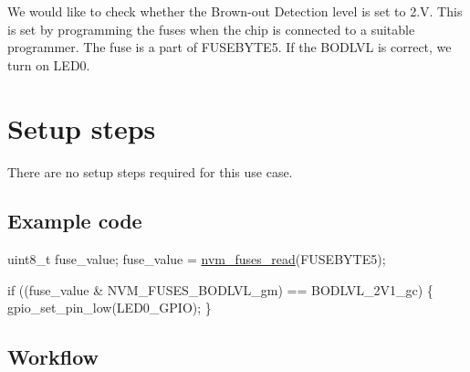We would like to check whether the Brown-\/out Detection level is set to 2.\-V. This is set by programming the fuses when the chip is connected to a suitable programmer. The fuse is a part of F\-U\-S\-E\-B\-Y\-T\-E5. If the B\-O\-D\-L\-V\-L is correct, we turn on L\-E\-D0.\hypertarget{xmega_nvm_quickstart_xmega_nvm_quickstart_fuse_case_setup_steps}{}\section{Setup steps}\label{xmega_nvm_quickstart_xmega_nvm_quickstart_fuse_case_setup_steps}
There are no setup steps required for this use case.\hypertarget{xmega_nvm_quickstart_nvm_quickstart_fuse_case_example_code}{}\subsection{Example code}\label{xmega_nvm_quickstart_nvm_quickstart_fuse_case_example_code}

\begin{DoxyCode}
         uint8\_t fuse\_value;
         fuse\_value = \hyperlink{group__nvm__fuse__lock__group_ga7f38ae8b811b4b6c7a209e37cfe1b03d}{nvm\_fuses\_read}(FUSEBYTE5);

         \textcolor{keywordflow}{if} ((fuse\_value & NVM\_FUSES\_BODLVL\_gm) == BODLVL\_2V1\_gc) \{
             gpio\_set\_pin\_low(LED0\_GPIO);
         \}
\end{DoxyCode}
\hypertarget{xmega_nvm_quickstart_nvm_quickstart_fuse_case_workflow}{}\subsection{Workflow}\label{xmega_nvm_quickstart_nvm_quickstart_fuse_case_workflow}

